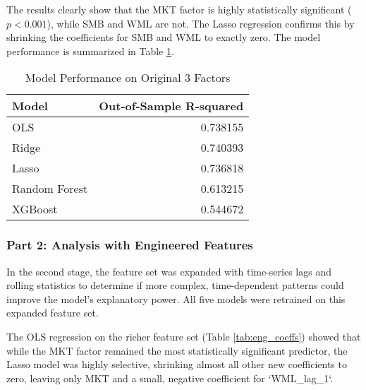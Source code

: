 \documentclass[12pt]{article}
\begin{document}
The results clearly show that the MKT factor is highly statistically significant ($p < 0.001$), while SMB and WML are not. The Lasso regression confirms this by shrinking the coefficients for SMB and WML to exactly zero. The model performance is summarized in Table \ref{tab:3factor_perf}.

\begin{table}[H]
    \centering
    \caption{Model Performance on Original 3 Factors}
    \label{tab:3factor_perf}
    \begin{tabular}{lr}
        \hline
        \textbf{Model} & \textbf{Out-of-Sample R-squared} \\
        \hline
        OLS & 0.738155 \\
        Ridge & 0.740393 \\
        Lasso & 0.736818 \\
        Random Forest & 0.613215 \\
        XGBoost & 0.544672 \\
        \hline
    \end{tabular}
\end{table}

\subsubsection{Part 2: Analysis with Engineered Features}
In the second stage, the feature set was expanded with time-series lags and rolling statistics to determine if more complex, time-dependent patterns could improve the model's explanatory power. All five models were retrained on this expanded feature set.

The OLS regression on the richer feature set (Table \ref{tab:eng_coeffs}) showed that while the MKT factor remained the most statistically significant predictor, the Lasso model was highly selective, shrinking almost all other new coefficients to zero, leaving only MKT and a small, negative coefficient for `WML\_lag\_1`.
\end{document}
